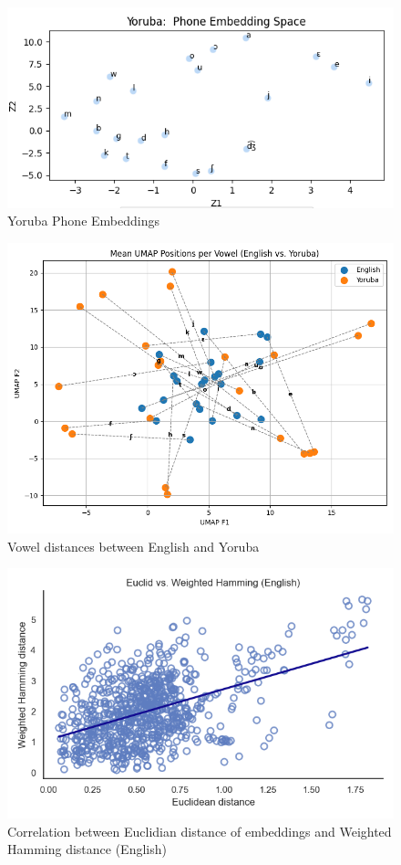 \documentclass[11pt]{article}
\begin{document}
{\begin{figure}
    \centering
    \includegraphics[width=1\linewidth]{yorlast.png}
    \caption{Yoruba Phone Embeddings}
    \label{fig:placeholder}
\end{figure}

\begin{figure}
    \centering
    \includegraphics[width=1\linewidth]{yoruba_eng_plot.png}
    \caption{Vowel distances between English and Yoruba}
    \label{fig:placeholder}
\end{figure}

\begin{figure}
    \centering
    \includegraphics[width=1\linewidth]{timitcor.png}
    \caption{Correlation between Euclidian distance of embeddings and Weighted Hamming distance (English)}
    \label{fig:placeholder}
\end{figure}

}
\end{document}
